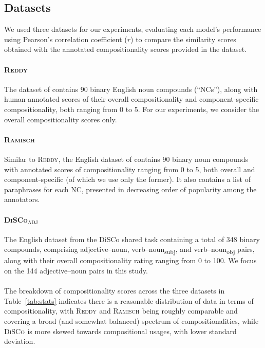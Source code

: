 \documentclass[11pt,a4paper]{article}
\newcommand{\dataset}[2][]{\textsc{#2}$_{\text{#1}}$\xspace}
\newcommand{\reddy}{\dataset{Reddy}}
\newcommand{\ramisch}{\dataset{Ramisch}}
\newcommand{\discoj}[1][]{\dataset[#1]{DiSCo}}
\newcommand{\tabref}[2][]{Table#1~\ref{#2}\xspace}
\begin{document}
\subsection{Datasets}
\label{sec:datasets}
We used three datasets for our experiments, evaluating each model's performance using Pearson's correlation coefficient ($r$) to compare the similarity scores obtained with the annotated compositionality scores provided in the dataset.
\paragraph{\reddy}
The dataset of  contains 90 binary English noun compounds (``NCs''), along with human-annotated scores of their overall compositionality and component-specific compositionality, both ranging from 0 to 5. For our experiments, we consider the overall compositionality scores only.

\paragraph{\ramisch}
Similar to \reddy, the English dataset of \citet{Ramisch2016} contains 90 binary noun compounds with annotated scores of compositionality ranging from 0 to 5, both overall and component-specific (of which we use only the former). It also contains a list of paraphrases for each NC, presented in decreasing order of popularity among the annotators.

\paragraph{\discoj[ADJ]}
The English dataset from the DiSCo shared task \cite{Disco2011} containing a total of 348 binary compounds, comprising adjective--noun, verb--noun\textsubscript{subj}, and verb--noun\textsubscript{obj} pairs, along with their overall compositionality rating ranging from 0 to 100.
We focus on the 144 adjective--noun pairs in this study.

\paragraph{}
The breakdown of compositionality scores across the three datasets in \tabref{tab:stats} indicates there is a reasonable distribution of data in terms of compositionality, with \reddy and \ramisch being roughly comparable and covering a broad (and somewhat balanced) spectrum of compositionalities, while \discoj is more skewed towards compositional usages, with lower standard deviation.
\end{document}
